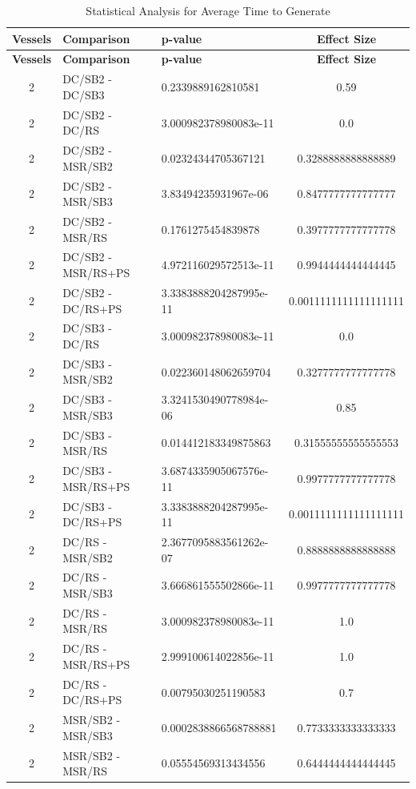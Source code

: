 \documentclass[10pt,a4paper]{article}
\begin{document}
\begin{longtable}{c l l c}
\caption{Statistical Analysis for Average Time to Generate} \\
\toprule
\textbf{Vessels} & \textbf{Comparison} & \textbf{p-value} & \textbf{Effect Size} \\
\midrule
\endfirsthead
\toprule
\textbf{Vessels} & \textbf{Comparison} & \textbf{p-value} & \textbf{Effect Size} \\
\midrule
\endhead
\bottomrule
\endfoot

2 & DC/SB2 - DC/SB3 & 0.2339889162810581 & 0.59 \\
2 & DC/SB2 - DC/RS & 3.000982378980083e-11 & 0.0 \\
2 & DC/SB2 - MSR/SB2 & 0.02324344705367121 & 0.3288888888888889 \\
2 & DC/SB2 - MSR/SB3 & 3.83494235931967e-06 & 0.8477777777777777 \\
2 & DC/SB2 - MSR/RS & 0.1761275454839878 & 0.3977777777777778 \\
2 & DC/SB2 - MSR/RS+PS & 4.972116029572513e-11 & 0.9944444444444445 \\
2 & DC/SB2 - DC/RS+PS & 3.3383888204287995e-11 & 0.0011111111111111111 \\
2 & DC/SB3 - DC/RS & 3.000982378980083e-11 & 0.0 \\
2 & DC/SB3 - MSR/SB2 & 0.022360148062659704 & 0.3277777777777778 \\
2 & DC/SB3 - MSR/SB3 & 3.3241530490778984e-06 & 0.85 \\
2 & DC/SB3 - MSR/RS & 0.014412183349875863 & 0.31555555555555553 \\
2 & DC/SB3 - MSR/RS+PS & 3.6874335905067576e-11 & 0.9977777777777778 \\
2 & DC/SB3 - DC/RS+PS & 3.3383888204287995e-11 & 0.0011111111111111111 \\
2 & DC/RS - MSR/SB2 & 2.3677095883561262e-07 & 0.8888888888888888 \\
2 & DC/RS - MSR/SB3 & 3.666861555502866e-11 & 0.9977777777777778 \\
2 & DC/RS - MSR/RS & 3.000982378980083e-11 & 1.0 \\
2 & DC/RS - MSR/RS+PS & 2.999100614022856e-11 & 1.0 \\
2 & DC/RS - DC/RS+PS & 0.00795030251190583 & 0.7 \\
2 & MSR/SB2 - MSR/SB3 & 0.0002838866568788881 & 0.7733333333333333 \\
2 & MSR/SB2 - MSR/RS & 0.05554569313434556 & 0.6444444444444445 \\

\end{longtable}
\end{document}

